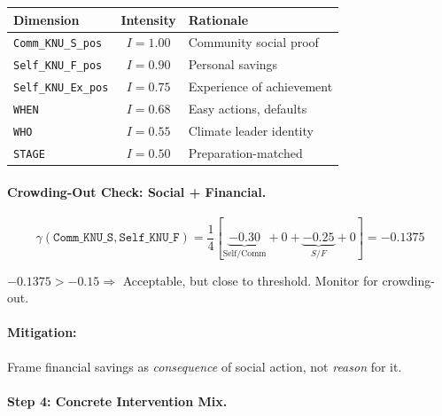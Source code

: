 \begin{center}
\begin{tabular}{@{}lcl@{}}
\toprule
\textbf{Dimension} & \textbf{Intensity} & \textbf{Rationale} \\
\midrule
\texttt{Comm\_KNU\_S\_pos} & $I = 1.00$ & Community social proof \\
\texttt{Self\_KNU\_F\_pos} & $I = 0.90$ & Personal savings \\
\texttt{Self\_KNU\_Ex\_pos} & $I = 0.75$ & Experience of achievement \\
\texttt{WHEN} & $I = 0.68$ & Easy actions, defaults \\
\texttt{WHO} & $I = 0.55$ & Climate leader identity \\
\texttt{STAGE} & $I = 0.50$ & Preparation-matched \\
\bottomrule
\end{tabular}
\end{center}

\paragraph{Crowding-Out Check: Social + Financial.}

\begin{equation}
\gamma(\texttt{Comm\_KNU\_S}, \texttt{Self\_KNU\_F}) = \frac{1}{4}[\underbrace{-0.30}_{\text{Self/Comm}} + 0 + \underbrace{-0.25}_{S/F} + 0] = -0.1375
\end{equation}

$-0.1375 > -0.15 \Rightarrow$ Acceptable, but close to threshold. Monitor for crowding-out.

\paragraph{Mitigation:} Frame financial savings as \emph{consequence} of social action, not \emph{reason} for it.

\paragraph{Step 4: Concrete Intervention Mix.}


